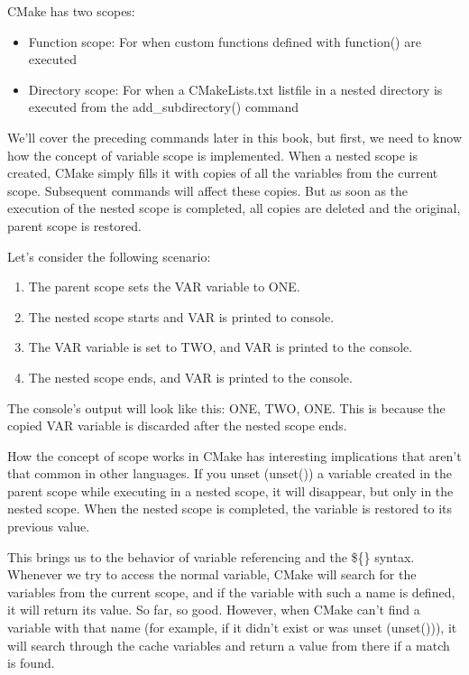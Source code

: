 CMake has two scopes:

\begin{itemize}
\item 
Function scope: For when custom functions defined with function() are executed

\item 
Directory scope: For when a CMakeLists.txt listfile in a nested directory is executed from the add\_subdirectory() command
\end{itemize}

We'll cover the preceding commands later in this book, but first, we need to know how the concept of variable scope is implemented. When a nested scope is created, CMake simply fills it with copies of all the variables from the current scope. Subsequent commands will affect these copies. But as soon as the execution of the nested scope is completed, all copies are deleted and the original, parent scope is restored.

Let's consider the following scenario:

\begin{enumerate}
\item 
The parent scope sets the VAR variable to ONE.

\item 
The nested scope starts and VAR is printed to console.

\item 
The VAR variable is set to TWO, and VAR is printed to the console.

\item 
The nested scope ends, and VAR is printed to the console.
\end{enumerate}

The console's output will look like this: ONE, TWO, ONE. This is because the copied VAR variable is discarded after the nested scope ends.

How the concept of scope works in CMake has interesting implications that aren't that common in other languages. If you unset (unset()) a variable created in the parent scope while executing in a nested scope, it will disappear, but only in the nested scope. When the nested scope is completed, the variable is restored to its previous value.

This brings us to the behavior of variable referencing and the \$\{\} syntax. Whenever we try to access the normal variable, CMake will search for the variables from the current scope, and if the variable with such a name is defined, it will return its value. So far, so good. However, when CMake can't find a variable with that name (for example, if it didn't exist or was unset (unset())), it will search through the cache variables and return a value from there if a match is found.

